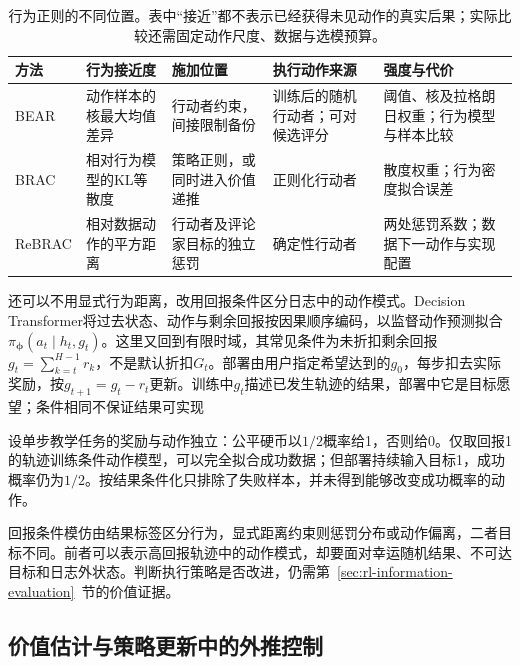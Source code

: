 \begin{table}[t]
  \centering
  \small
  \begin{tabularx}{\linewidth}{p{15mm}XXXX}
    \toprule
    方法 & 行为接近度 & 施加位置 & 执行动作来源 & 强度与代价 \\
    \midrule
    BEAR & 动作样本的核最大均值差异 & 行动者约束，间接限制备份 & 训练后的随机行动者；可对候选评分 & 阈值、核及拉格朗日权重；行为模型与样本比较 \\
    BRAC & 相对行为模型的KL等散度 & 策略正则，或同时进入价值递推 & 正则化行动者 & 散度权重；行为密度拟合误差 \\
    ReBRAC & 相对数据动作的平方距离 & 行动者及评论家目标的独立惩罚 & 确定性行动者 & 两处惩罚系数；数据下一动作与实现配置 \\
    \bottomrule
  \end{tabularx}
  \caption{行为正则的不同位置。表中“接近”都不表示已经获得未见动作的真实后果；实际比较还需固定动作尺度、数据与选模预算。}
  \label{tab:rl-information-behavior-methods}
\end{table}

还可以不用显式行为距离，改用回报条件区分日志中的动作模式。Decision Transformer将过去状态、动作与剩余回报按因果顺序编码，以监督动作预测拟合$\pi_{\bm\phi}(a_t\mid h_t,g_t)$。这里又回到有限时域，其常见条件为未折扣剩余回报$g_t=\sum_{k=t}^{H-1}r_k$，不是默认折扣$G_t$。部署由用户指定希望达到的$g_0$，每步扣去实际奖励，按$g_{t+1}=g_t-r_t$更新。训练中$g_t$描述已发生轨迹的结果，部署中它是目标愿望；条件相同不保证结果可实现

\begin{example}[回报条件不能控制外部随机结果]
  \label{ex:rl-information-return-conditioning}
  设单步教学任务的奖励与动作独立：公平硬币以$1/2$概率给1，否则给0。仅取回报1的轨迹训练条件动作模型，可以完全拟合成功数据；但部署持续输入目标1，成功概率仍为$1/2$。按结果条件化只排除了失败样本，并未得到能够改变成功概率的动作。
\end{example}

回报条件模仿由结果标签区分行为，显式距离约束则惩罚分布或动作偏离，二者目标不同。前者可以表示高回报轨迹中的动作模式，却要面对幸运随机结果、不可达目标和日志外状态。判断执行策略是否改进，仍需第~\ref{sec:rl-information-evaluation}~节的价值证据。

\subsection{价值估计与策略更新中的外推控制}
\label{sec:rl-information-pessimism}

